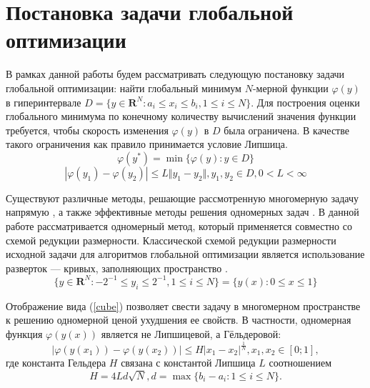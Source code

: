\documentclass[11pt, oneside, a4paper]{article}
\begin{document}
\section{Постановка задачи глобальной оптимизации}
В рамках данной работы будем рассматривать следующую постановку задачи глобальной
оптимизации: найти глобальный минимум \(N\)-мерной функции \(\varphi(y)\) в гиперинтервале
\(D=\{y\in \mathbf{R}^N:a_i\leqslant x_i\leqslant{b_i}, 1\leqslant{i}\leqslant{N}\}\).
Для построения оценки глобального минимума по конечному количеству вычислений
значения функции требуется, чтобы скорость изменения \(\varphi(y)\) в \(D\) была ограничена.
В качестве такого ограничения как правило принимается условие Липшица.
\begin{equation}
\label{eq:task}
\varphi(y^*)=\min\{\varphi(y):y\in D\}
\end{equation}
\begin{displaymath}
\label{lip}
|\varphi(y_1)-\varphi(y_2)|\leqslant L\Vert y_1-y_2\Vert,y_1,y_2\in D,0<L<\infty
\end{displaymath}

Существуют различные методы, решающие рассмотренную многомерную задачу напрямую \cite{SergeyevKvasov2017, Jones2009},
а также эффективные методы решения одномерных задач \cite{Norkin1992, Strongin2000}. В данной работе рассматривается одномерный метод,
который применяется совместно со схемой редукции размерности.
Классической схемой редукции размерности исходной задачи для алгоритмов глобальной оптимизации является
использование разверток --- кривых, заполняющих пространство \cite{Sergeyev2013}.
\begin{equation}
\label{cube}
\lbrace y\in \mathbf{R}^N:-2^{-1}\leqslant y_i\leqslant 2^{-1},1\leqslant i\leqslant N\rbrace=\{y(x):0\leqslant x\leqslant 1\}
\end{equation}

Отображение вида (\ref{cube}) позволяет свести задачу в многомерном пространстве к решению
одномерной ценой ухудшения ее свойств. В частности, одномерная функция \(\varphi(y(x))\)
является не Липшицевой, а Гёльдеровой:
\begin{displaymath}
\label{holder}
|\varphi(y(x_1))-\varphi(y(x_2))|\leqslant H{|x_1-x_2|}^{\frac{1}{N}},x_1,x_2\in[0;1],
\end{displaymath}
где константа Гельдера \(H\) связана с константой Липшица \(L\) соотношением
\begin{displaymath}
H=4Ld\sqrt{N},d=\max\{b_i-a_i:1\leqslant i\leqslant N\}.
\end{displaymath}
\end{document}
